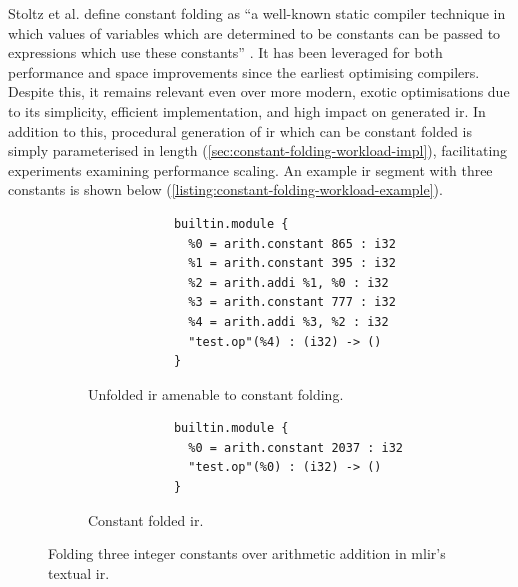 Stoltz et al. define constant folding as ``a well-known static compiler technique in which values of variables which are determined to be constants can be passed to expressions which use these constants'' \cite{stoltzConstantPropagationFresh1994}.
It has been leveraged for both performance and space improvements since the earliest optimising compilers. Despite this, it remains relevant even over more modern, exotic optimisations due to its simplicity, efficient implementation, and high impact on generated \ac{ir}.
In addition to this, procedural generation of \ac{ir} which can be constant folded is simply parameterised in length (\autoref{sec:constant-folding-workload-impl}), facilitating experiments examining performance scaling.
An example \ac{ir} segment with three constants is shown below (\autoref{listing:constant-folding-workload-example}).


\begin{figure}[H]
    \centering
    \begin{subfigure}[b]{0.45\textwidth}
       \centering
        \begin{verbatim}
            builtin.module {
              %0 = arith.constant 865 : i32
              %1 = arith.constant 395 : i32
              %2 = arith.addi %1, %0 : i32
              %3 = arith.constant 777 : i32
              %4 = arith.addi %3, %2 : i32
              "test.op"(%4) : (i32) -> ()
            }
        \end{verbatim}
        \label{listing:constant-folding-workload-initial}
        \caption{Unfolded \ac{ir} amenable to constant folding.}
    \end{subfigure}
    \hfill
    \begin{subfigure}[b]{0.45\textwidth}
        \centering
        \begin{verbatim}
            builtin.module {
              %0 = arith.constant 2037 : i32
              "test.op"(%0) : (i32) -> ()
            }
        \end{verbatim}
        \footnotesize\vspace{2.5em}
        \caption{Constant folded \ac{ir}.}
        \label{listing:constant-folding-workload-folded}
    \end{subfigure}
    \vspace{1em}
    \captionsetup{name=Listing}
    \caption{Folding three integer constants over arithmetic addition in \ac{mlir}'s textual \ac{ir}.}
    \label{listing:constant-folding-workload-example}
\end{figure}

